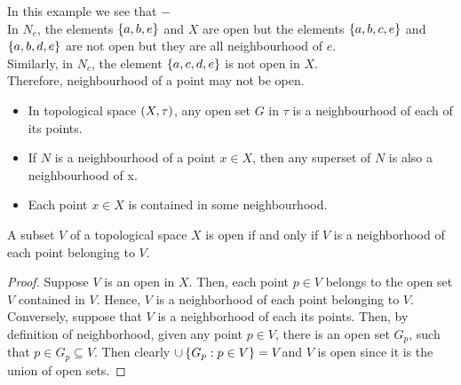 \documentclass[../main-sheet.tex]{subfiles}
\begin{document}
In this example we see that \(-\)\\
In  \(N_e\), the elements  \(\left\{a, b, e\right\}\) and  \(X\) are open but the elements  \(\left\{a, b, c, e\right\}\) and  \(\left\{a, b,d, e\right\}\) are not open but they are all neighbourhood of  \(e\).\\
Similarly, in  \(N_c\), the element  \(\left\{a, c, d, e\right\}\) is not open in  \(X\).\\ Therefore, neighbourhood of a point may not be open.
\begin{rem}
    \hfill
    \begin{itemize}
        \item In topological space  \((X, \tau)\), any open set  \(G\) in  \(\tau\) is a neighbourhood of each of its points.
        \item If  \(N\) is a neighbourhood of a point  \(x \in X\), then any
        superset of  \(N\) is also a neighbourhood of x.
        \item Each point  \(x \in X\) is contained in some neighbourhood.
    \end{itemize}
\end{rem}
\begin{lem}
    A subset  \(V\) of a topological space  \(X\) is open if and only if  \(V\) is a neighborhood of each point belonging to  \(V\).
\end{lem}
\begin{proof}
    Suppose  \(V\) is an open in  \(X\). Then, each point  \(p \in V\)
    belongs to the open set  \(V\) contained in  \(V\). Hence,  \(V\) is a
    neighborhood of each point belonging to  \(V\).\\
    Conversely, suppose that  \(V\) is a neighborhood of each its points. Then, by definition of neighborhood, given any point  \(p\in V\), there is an open set  \(G_p\), such that  \(p\in G_p \subseteq V\). Then clearly  \(\cup\left\{G_p:p\in V\right\}=V\)and  \(V\) is open since it is the union of open sets.
\end{proof}
\end{document}
